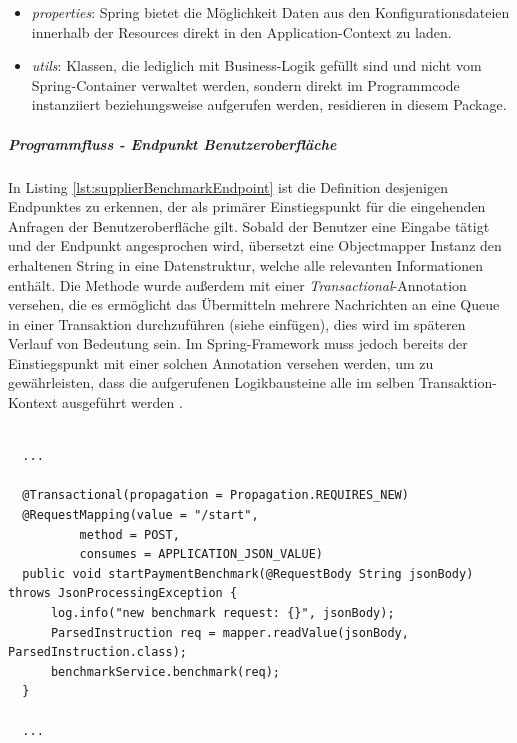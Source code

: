 \begin{itemize}
  \item \emph{properties}: Spring bietet die Möglichkeit Daten aus den Konfigurationsdateien innerhalb der Resources direkt in den Application-Context zu laden.
  
  \item \emph{utils}: Klassen, die lediglich mit Business-Logik gefüllt sind und nicht vom Spring-Container verwaltet werden, sondern direkt im Programmcode instanziiert beziehungsweise aufgerufen werden, residieren in diesem Package.

\end{itemize}


\subparagraph{Programmfluss - Endpunkt Benutzeroberfläche}
In Listing \ref{lst:supplierBenchmarkEndpoint} ist die Definition desjenigen Endpunktes zu erkennen, der als primärer Einstiegspunkt für die eingehenden Anfragen der Benutzeroberfläche gilt. Sobald der Benutzer eine Eingabe tätigt und der Endpunkt angesprochen wird, übersetzt eine Objectmapper Instanz den erhaltenen String in eine Datenstruktur, welche alle relevanten Informationen enthält. Die Methode wurde außerdem mit einer \emph{Transactional}-Annotation versehen, die es ermöglicht das Übermitteln mehrere Nachrichten an eine Queue in einer Transaktion durchzuführen (siehe  einfügen), dies wird im späteren Verlauf von Bedeutung sein. Im Spring-Framework muss jedoch bereits der Einstiegspunkt mit einer solchen Annotation versehen werden, um zu gewährleisten, dass die aufgerufenen Logikbausteine alle im selben Transaktion-Kontext ausgeführt werden .

\begin{lstlisting}[style=javaStyle,caption={Supplier - Endpunkt},label=lst:supplierBenchmarkEndpoint]

  ...

  @Transactional(propagation = Propagation.REQUIRES_NEW)
  @RequestMapping(value = "/start",
          method = POST,
          consumes = APPLICATION_JSON_VALUE)
  public void startPaymentBenchmark(@RequestBody String jsonBody) throws JsonProcessingException {
      log.info("new benchmark request: {}", jsonBody);
      ParsedInstruction req = mapper.readValue(jsonBody, ParsedInstruction.class);
      benchmarkService.benchmark(req);
  }

  ...
  
\end{lstlisting}




